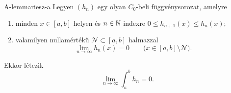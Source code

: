 \documentclass[
]{elteikthesis}[2024/04/26]
\begin{document}
	\begin{lemma}{A-lemma}{riesz-a}
		Legyen \( (h_n) \) egy olyan \( C_0 \)-beli függvénysorozat, amelyre
		\begin{enumerate}[label=\roman*)]
			\item\label{eq:riesz-a-lemma-01}
			minden \( x \in [a, b] \) helyen és \( n \in \mathbb{N} \) indexre
			\( 0 \leq h_{n+1}(x) \leq h_n(x) \);

			\item\label{eq:riesz-a-lemma-02}
			valamilyen nullamértékű \( \mathcal{N} \subset [a,b] \) halmazzal
			\[
				\lim_{n \to \infty} h_n(x) = 0 
				\qquad \bigl( x \in [a, b] \setminus \mathcal{N} \bigr).
			\]
		\end{enumerate}
		Ekkor létezik 
		\[
			\lim_{n \to \infty} \int_a^b h_n = 0.
		\]
	\end{lemma}
\end{document}
